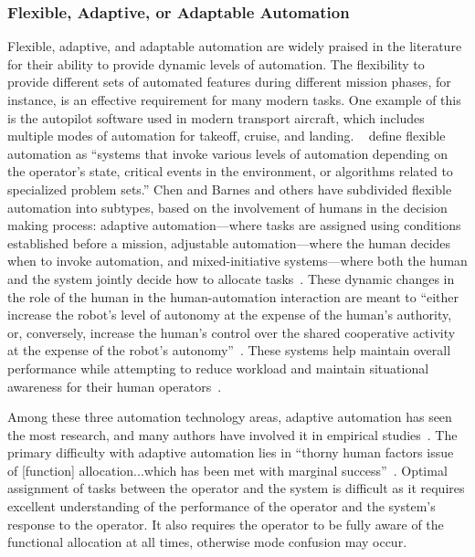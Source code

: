 \subsubsection{Flexible, Adaptive, or Adaptable Automation}
Flexible, adaptive, and adaptable automation are widely praised in the literature for their ability to provide dynamic levels of automation.
The flexibility to provide different sets of automated features during different mission phases, for instance, is an effective requirement for many modern tasks.
One example of this is the autopilot software used in modern transport aircraft, which includes multiple modes of automation for takeoff, cruise, and landing.
~\citeauthor{chen_humanagent_2014} define flexible automation as ``systems that invoke various levels of automation depending on the operator's state, critical events in the environment, or algorithms related to specialized problem sets.''
Chen and Barnes and others have subdivided flexible automation into subtypes, based on the involvement of humans in the decision making process: adaptive automation—where tasks are assigned using conditions established before a mission, adjustable automation—where the human decides when to invoke automation, and mixed-initiative systems—where both the human and the system jointly decide how to allocate tasks~\citep{chen_humanagent_2014, beer_toward_2014}.
These dynamic changes in the role of the human in the human-automation interaction are meant to ``either increase the robot's level of autonomy at the expense of the human's authority, or, conversely, increase the human's control over the shared cooperative activity at the expense of the robot's autonomy''~\citep{losey_review_2018}.
These systems help maintain overall performance while attempting to reduce workload and maintain situational awareness for their human operators~\citep{kaber_situation_2006}.

Among these three automation technology areas, adaptive automation has seen the most research, and many authors have involved it in empirical studies~\citep{vagia_literature_2016}.
The primary difficulty with adaptive automation lies in ``thorny human factors issue of [function] allocation...which has been met with marginal success''~\citep{vagia_literature_2016}.
Optimal assignment of tasks between the operator and the system is difficult as it requires excellent understanding of the performance of the operator and the system's response to the operator.
It also requires the operator to be fully aware of the functional allocation at all times, otherwise mode confusion may occur.

